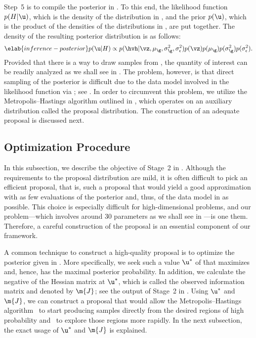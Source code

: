 Step~5 is to compile the posterior in . To this end, the
likelihood function $p(H | \u)$, which is the density of the distribution in
, and the prior $p(\u)$, which is the product of the
densities of the distributions in , are put together. The
density of the resulting posterior distribution is as follows:
\begin{equation} \elab{inference-posterior}
  p(\u | H) \propto p(\hvh | \vz, \mu_\g, \sigma^2_\g, \sigma^2_\epsilon) p(\vz) p(\mu_\g) p(\sigma^2_\g) p(\sigma^2_\epsilon).
\end{equation}
Provided that there is a way to draw samples from ,
the quantity of interest can be readily analyzed as we shall see in
. The problem, however, is that direct sampling
of the posterior is difficult due to the data model involved in the likelihood
function via \vh; see . In order to circumvent this
problem, we utilize the Metropolis--Hastings algorithm \cite{gelman2004}
outlined in , which operates on an auxiliary
distribution called the proposal distribution. The construction of an adequate
proposal is discussed next.

\subsection{Optimization Procedure}

In this subsection, we describe the objective of Stage~2 in
. Although the requirements to the proposal
distribution are mild, it is often difficult to pick an efficient proposal, that
is, such a proposal that would yield a good approximation with as few
evaluations of the posterior and, thus, of the data model in
 as possible. This choice is especially difficult for
high-dimensional problems, and our problem---which involves around 30 parameters
as we shall see in ---is one them. Therefore, a careful
construction of the proposal is an essential component of our framework.

A common technique to construct a high-quality proposal is to optimize the
posterior given in . More specifically, we seek such a
value $\u^*$ of \u that maximizes  and, hence, has the
maximal posterior probability. In addition, we calculate the negative of the
Hessian matrix at $\u^*$, which is called the observed information matrix and
denoted by $\m{J}$; see the output of Stage~2 in .
Using $\u^*$ and $\m{J}$, we can construct a proposal that would allow the
Metropolis--Hastings algorithm \one~to start producing samples directly from the
desired regions of high probability and \two~to explore those regions more
rapidly. In the next subsection, the exact usage of $\u^*$ and $\m{J}$ is
explained.

